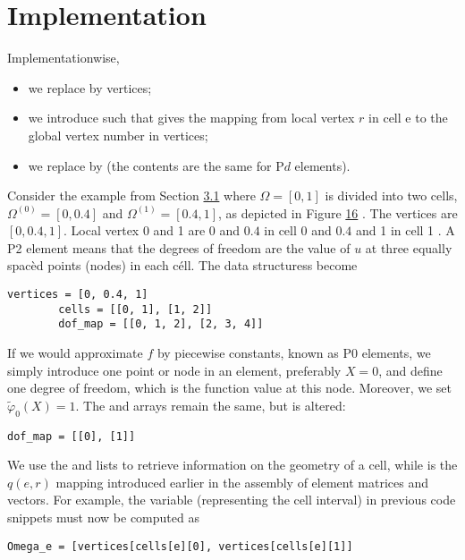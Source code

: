 \documentclass[../main.tex]{subfiles}
\begin{document}
	\section[Implementation]{Implementation}
	\label{sec:sec_6_3}
	\noindent Implementationwise,
	\begin{itemize}
		\item we replace  by vertices;
		\item we introduce  such that  gives the mapping from local vertex $r$ in cell e to the global vertex number in vertices;
		\item we replace  by  (the contents are the same for $\mathrm{P} d$ elements).
	\end{itemize}
	
	\noindent Consider the example from Section \hyperref[sec:sec_3_1]{3.1} where $\Omega=[0,1]$ is divided into two cells, $\Omega^{(0)}=[0,0.4]$ and $\Omega^{(1)}=[0.4,1]$, as depicted in Figure \hyperref[fig:img_16]{16} . The vertices are $[0,0.4,1]$. Local vertex 0 and 1 are 0 and $0.4$ in cell 0 and $0.4$ and 1 in cell 1 . A P2 element means that the degrees of freedom are the value of $u$ at three equally spacèd points (nodes) in each céll. The data structuress become
	\begin{lstlisting}[numbers=none]
		vertices = [0, 0.4, 1]
		cells = [[0, 1], [1, 2]]
		dof_map = [[0, 1, 2], [2, 3, 4]]	
	\end{lstlisting}
	If we would approximate $f$ by piecewise constants, known as $\mathrm{P} 0$ elements, we simply introduce one point or node in an element, preferably $X=0$, and define one degree of freedom, which is the function value at this node. Moreover, we set $\tilde{\varphi}_{0}(X)=1$. The  and  arrays remain the same, but  is altered:
	\begin{lstlisting}[numbers=none]
		dof_map = [[0], [1]]	
	\end{lstlisting}
	We use the  and  lists to retrieve information on the geometry of a cell, while   is the $q(e, r)$ mapping introduced earlier in the assembly of element matrices and vectors. For example, the   variable (representing the cell interval) in previous code snippets must now be computed as
	\begin{lstlisting}[numbers=none]
		Omega_e = [vertices[cells[e][0], vertices[cells[e][1]]	
	\end{lstlisting}
\end{document}
